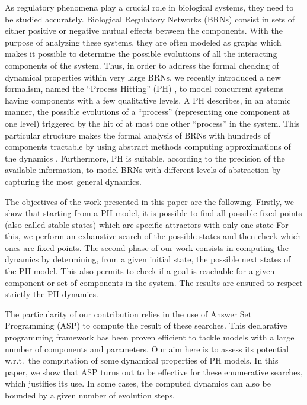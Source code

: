 As regulatory phenomena play a crucial role in biological systems, they need to
be studied accurately. Biological Regulatory Networks (BRNs) consist in sets
of either positive or negative mutual effects between the components. With the
purpose of analyzing these systems, they are often modeled as graphs which makes
it possible to determine the possible evolutions of all the interacting components of the system. Thus, in order to address the formal checking of dynamical properties within very large BRNs, we recently introduced a new formalism, named the “Process Hitting” (PH) \cite{PMR10-TCSB}, to model concurrent systems having components with a few qualitative levels. A PH describes, in an atomic manner, the possible evolutions of a “process” (representing one component at one level) triggered by the hit of at most one other “process” in the system. This particular structure makes the formal analysis of BRNs with hundreds of components tractable by using abstract methods computing approximations of the dynamics \cite{PMR12-MSCS}. Furthermore, PH is suitable, according to the precision of the available information, to model BRNs with different levels of abstraction by capturing the most general dynamics.

The objectives of the work presented in this paper are the following.
Firstly, we show that starting from a PH model, it is possible to find all possible
fixed points (also called stable states)
which are specific attractors with only one state%
For this, we perform an exhaustive search of the possible states and then check which ones are fixed points.
The second phase of our work consists in computing the dynamics by determining, from a given initial state, the possible next states of the PH model.
This also permits to check if a goal is reachable for a given component or set of components in the system.
The results are ensured to respect strictly the PH dynamics.

The particularity of our contribution relies in the use of Answer Set Programming
(ASP)%
to compute the result of these searches.
This declarative programming framework has been proven efficient
to tackle models with a large number of components and parameters.
Our aim here is to assess its potential w.r.t.\ the computation
of some dynamical properties of PH models.
In this paper, we show that ASP turns out to be effective
for these enumerative searches, which justifies its use.
In some cases, the computed dynamics can also be bounded by a given
number of evolution steps.


